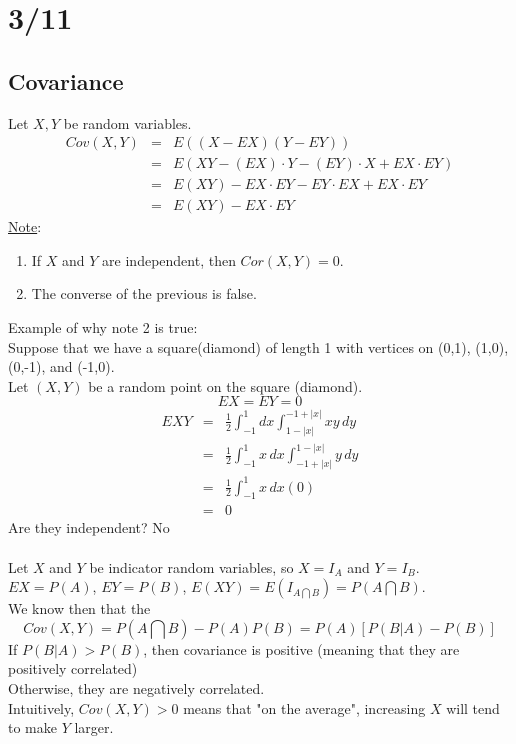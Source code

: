 \section*{3/11}
  \subsection*{Covariance}
    Let $X,Y$ be random variables.\\
    \begin{eqnarray*}
      Cov(X,Y) & = & E((X - EX)(Y - EY))\\
      & = & E(XY - (EX) \cdot Y - (EY) \cdot X + EX \cdot EY)\\
      & = & E(XY) - EX \cdot EY - EY \cdot EX + EX \cdot EY\\
      & = & E(XY) - EX \cdot EY
    \end{eqnarray*}
    \underline{Note}:
    \begin{enumerate}
      \item If $X$ and $Y$ are independent, then $Cor(X,Y) = 0$.
      \item The converse of the previous is false.
    \end{enumerate}
    Example of why note 2 is true:\\
    Suppose that we have a square(diamond) of length 1 with vertices on 
    (0,1), (1,0), (0,-1), and (-1,0).\\
    Let $(X,Y)$ be a random point on the square (diamond). \\
    $$
      EX = EY = 0
    $$
    \begin{eqnarray*}
      EXY & = & \frac{1}{2} \int_{-1}^1 dx \int_{1 - |x|}^{-1 + |x|} xy\,dy\\
      & = & \frac{1}{2} \int_{-1}^1 x\,dx \int_{-1 + |x|}^{1 - |x|}y \,dy\\
      & = & \frac{1}{2} \int_{-1}^1 x\,dx (0)\\
      & = & 0
    \end{eqnarray*}
    Are they independent? No\\\\
    Let $X$ and $Y$ be indicator random variables, so $X = I_A$ and $Y = I_B$.\\
    $EX = P(A)$, $EY = P(B)$, $E(XY) = E(I_{A \bigcap B}) = P(A \bigcap B)$.\\
    We know then that the 
    $$
      Cov(X,Y) = P(A \bigcap B) - P(A)P(B) = P(A)[P(B|A) - P(B)]
    $$
    If $P(B|A) > P(B)$, then covariance is positive (meaning that they are 
    positively correlated)\\
    Otherwise, they are negatively correlated.\\
    Intuitively, $Cov(X,Y) > 0$ means that "on the average", increasing $X$ will
    tend to make $Y$ larger.\\
